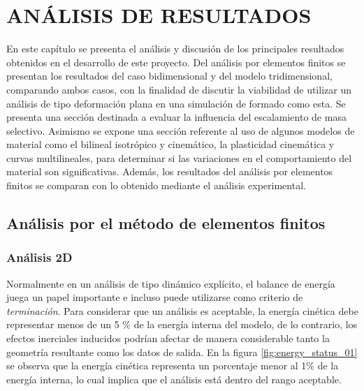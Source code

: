 \chapter{ANÁLISIS DE RESULTADOS}

En este capítulo se presenta el análisis y discusión de los principales resultados 
obtenidos en el desarrollo de este proyecto. Del análisis por elementos finitos 
se presentan los resultados del caso bidimensional y del modelo tridimensional, comparando 
ambos casos, con la finalidad de discutir la viabilidad de utilizar un análisis de tipo 
deformación plana en una simulación de formado como esta. 
Se presenta una sección destinada 
a evaluar la influencia del escalamiento de masa selectivo. Asimismo se expone una sección 
referente al uso de algunos modelos de material como el bilineal isotrópico y cinemático, 
la plasticidad cinemática y curvas multilineales, para determinar si las variaciones 
en el comportamiento del material son significativas.
Además, los resultados del 
análisis por elementos finitos se comparan con lo obtenido mediante el análisis experimental.


\section{Análisis por el método de elementos finitos}

\subsection{Análisis 2D}


Normalmente en un análisis de tipo dinámico explícito, el balance de energía juega 
un papel importante e incluso puede utilizarse como criterio de \textit{terminación}. 
Para considerar que un análisis es aceptable, la energía cinética debe representar 
menos de un 5 \% de la energía interna del modelo, de lo contrario, los efectos 
inerciales inducidos podrían afectar de manera considerable tanto la geometría 
resultante como los datos de salida. En la figura \ref{fig:energy_status_01} se observa 
que la energía cinética representa un porcentaje menor al 1\% de la energía interna, lo 
cual implica que el análisis está dentro del rango aceptable. \\


